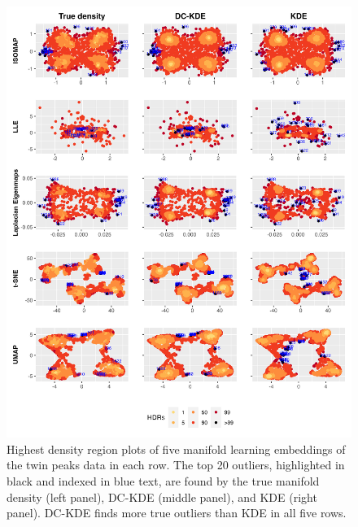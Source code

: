 \documentclass[
]{article}
\begin{document}
\begin{figure}[!p]

{\centering \includegraphics[width=0.85\linewidth]{figures/Twin Peak2000_5levels_outliers_comparison_5ml_r0_5} 

}

\caption{Highest density region plots of five manifold learning embeddings of the twin peaks data in each row. The top 20 outliers, highlighted in black and indexed in blue text, are found by the true manifold density (left panel), DC-KDE (middle panel), and KDE (right panel). DC-KDE finds more true outliers than KDE in all five rows.}\label{fig:tpoutliers}
\end{figure}
\end{document}

